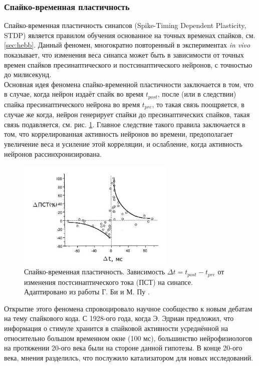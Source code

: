 \documentclass[a4paper,10pt]{article}
\begin{document}
\subsubsection{Спайко-временная пластичность}\label{sec:stdp}
\indent Спайко-временная пластичность синапсов (Spike-Timing Dependent Plasticity, STDP) является правилом обучения основанное на точных временах спайков, см. \ref{sec:hebb}. Данный феномен, многократно повторенный в экспериментах \textit{in vivo} показывает, что изменения веса синапса может быть в зависимости от точных времен спайков пресинаптического и постсинаптического нейронов, с точностью до милисекунд.\\
\indent Основная идея феномена спайко-временной пластичности заключается в том, что в случае, когда нейрон издаёт спайк во время $t_{post}$, после (или в следствии) спайка пресинаптического нейрона во время $t_{pre}$, то такая связь поощряется, в случае же когда, нейрон генерирует спайки до пресинаптических спайков, такая связь подавляется, см. рис. \ref{stdp_pic}. Главное следствие такого правила заключается в том, что коррелированная активность нейронов во времени, предополагает увеличение веса и усиление этой корреляции, и ослабление, когда активность нейронов рассинхронизирована.\\
\begin{figure}[ht]
\centering
\captionsetup{justification=centering,margin=1cm}
\includegraphics[width=75mm,scale=0.7]{stdp.jpg}
\caption{Спайко-временная пластичность. Зависимость $\Delta t = t_{post} - t_{pre}$ от изменения постсинаптического тока (ПСТ) на синапсе. Адаптировано из работы Г. Би и М. Пу \cite{stdp4}. }
\label{stdp_pic}
\end{figure}
\FloatBarrier
\indent Открытие этого феномена спровоцировало научное сообщество к новым дебатам на тему спайкового кода. С 1928-ого года, когда Э. Эдриан\cite{rate_first} предложил, что информация о стимуле хранится в спайковой активности усреднённой на относительно большом временном окне (100 мс), большинство нейрофизиологов на протяжении 20-ого века были на стороне данной гипотезы. В конце 20-ого века, мнения разделилсь, что послужило катализатором для новых исследований.\\
\end{document}
